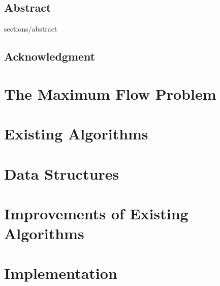 \documentclass[a4paper,11pt, openright]{book}
\theoremstyle{definition}
\begin{document}
\pagestyle{empty} %



\restoregeometry
\cleardoublepage
\section*{Abstract}
 {sections/abstract}
\cleardoublepage
\section*{Acknowledgment}

\cleardoublepage
\tableofcontents %
\cleardoublepage %

\pagestyle{plain} %




\chapter{The Maximum Flow Problem}\label{flow_problem}


\chapter{Existing Algorithms}\label{algos}


\chapter{Data Structures}\label{data_struct}


\chapter{Improvements of Existing Algorithms}\label{improvements}


\chapter{Implementation}\label{implementation}

\end{document}

